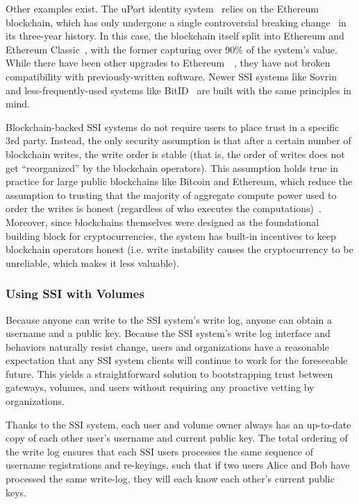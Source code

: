 Other examples exist.  The uPort identity system~\cite{uport} relies
on the Ethereum blockchain, which has only undergone a single controversial
breaking change~\cite{thedao-hard-fork} in its three-year history.  In this case, the blockchain itself split into Ethereum
and Ethereum Classic~\cite{ethereum-split}, with the former capturing over 90\%
of the system's value.  While there have been other upgrades to
Ethereum~\cite{ethereum-state-hard-fork}~\cite{homestead-hard-fork}, they have
not broken compatibility with previously-written software.  Newer SSI systems
like Sovrin~\cite{sovrin} and less-frequently-used systems like
BitID~\cite{bitid} are built with the same principles in mind.

Blockchain-backed SSI systems do not require users to place trust in a specific 3rd
party.  Instead, the only security assumption is that after a certain number
of blockchain writes, the write order is stable (that is, the order of writes does not get
``reorganized'' by the blockchain operators).  This assumption holds true in
practice for large public blockchains like Bitcoin and Ethereum, which reduce the assumption to trusting
that the majority of aggregate compute power used to order the writes is honest
(regardless of who executes the computations)~\cite{proof-of-work}.  Moreover,
since blockchains themselves were designed as the foundational building block for
cryptocurrencies, the system has built-in incentives to keep blockchain
operators honest (i.e. write instability causes the cryptocurrency to be
unreliable, which makes it less valuable).

\subsubsection{Using SSI with Volumes}

Because anyone can write to the SSI system's write log, anyone can obtain a
username and a public key.  Because the SSI system's write log interface and
behaviors naturally resist change, users and organizations have a reasonable
expectation that any SSI system clients will continue to work for the
foreseeable future.  This yields a straightforward solution to bootstrapping
trust between gateways, volumes, and users without requiring any proactive
vetting by organizations.

Thanks to the SSI system, each user and volume owner always has an up-to-date
copy of each other user's username and current public key.  The total ordering
of the write log ensures that each SSI users processes the same sequence of
username registrations and re-keyings, such that if two users Alice and Bob have
processed the same write-log, they will each know each other's current public
keys.

